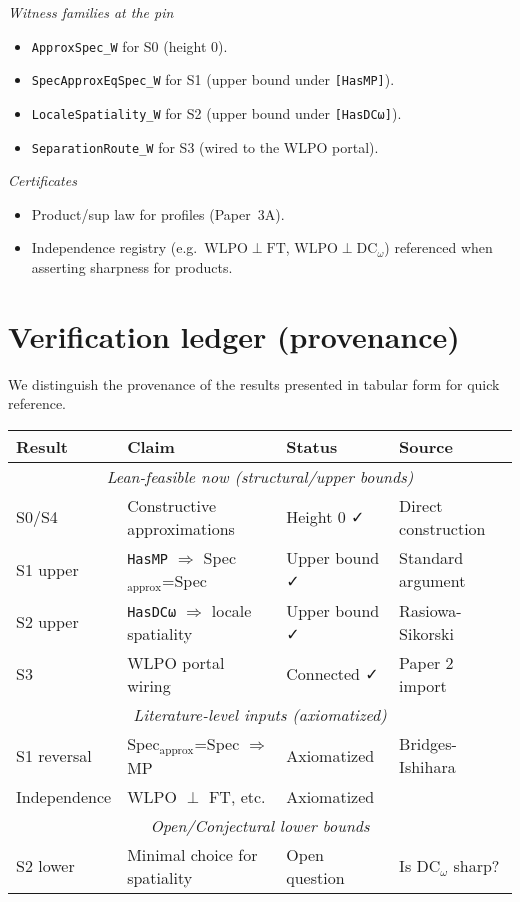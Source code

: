 \documentclass[11pt]{article}
\theoremstyle{plain}
\theoremstyle{definition}
\theoremstyle{remark}
\newcommand{\WLPO}{\mathrm{WLPO}}
\newcommand{\FT}{\mathrm{FT}}
\newcommand{\DCw}{\mathrm{DC}_\omega}
\begin{document}
\noindent\emph{Witness families at the pin}
\begin{itemize}
  \item \texttt{ApproxSpec\_W} for S0 (height 0).
  \item \texttt{SpecApproxEqSpec\_W} for S1 (upper bound under \texttt{[HasMP]}).
  \item \texttt{LocaleSpatiality\_W} for S2 (upper bound under \texttt{[HasDCω]}).
  \item \texttt{SeparationRoute\_W} for S3 (wired to the WLPO portal).
\end{itemize}

\noindent\emph{Certificates}
\begin{itemize}
  \item Product/sup law for profiles (Paper~3A).
  \item Independence registry (e.g.\ $\WLPO\perp \FT$, $\WLPO\perp \DCw$) referenced when asserting sharpness for products.
\end{itemize}

\section{Verification ledger (provenance)}\label{sec:ledger}

We distinguish the provenance of the results presented in tabular form for quick reference.

\begin{center}
\begin{tabular}{|l|p{5cm}|p{3.5cm}|p{3cm}|}
\hline
\textbf{Result} & \textbf{Claim} & \textbf{Status} & \textbf{Source} \\
\hline
\multicolumn{4}{|c|}{\textit{Lean-feasible now (structural/upper bounds)}} \\
\hline
S0/S4 & Constructive approximations & Height 0 ✓ & Direct construction \\
\hline
S1 upper & \texttt{HasMP} $\Rightarrow$ Spec$_{\text{approx}}$=Spec & Upper bound ✓ & Standard argument \\
\hline
S2 upper & \texttt{HasDCω} $\Rightarrow$ locale spatiality & Upper bound ✓ & Rasiowa-Sikorski \\
\hline
S3 & WLPO portal wiring & Connected ✓ & Paper 2 import \\
\hline
\multicolumn{4}{|c|}{\textit{Literature-level inputs (axiomatized)}} \\
\hline
S1 reversal & Spec$_{\text{approx}}$=Spec $\Rightarrow$ MP & Axiomatized & Bridges-Ishihara \cite{BridgesRichman} \\
\hline
Independence & WLPO $\perp$ FT, etc. & Axiomatized & \cite{Simpson, Ishihara06} \\
\hline
\multicolumn{4}{|c|}{\textit{Open/Conjectural lower bounds}} \\
\hline
S2 lower & Minimal choice for spatiality & Open question & Is DC$_\omega$ sharp? \\
\hline
\end{tabular}
\end{center}
\end{document}
